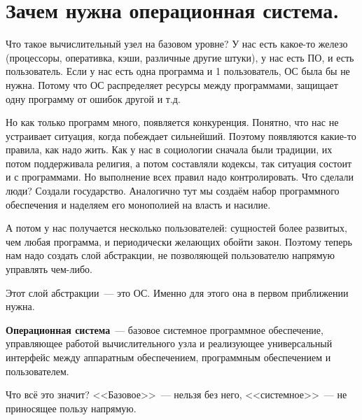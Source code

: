 \documentclass{article}
\begin{document}
    \tableofcontents\pagebreak
    \section{Зачем нужна операционная система.}
    Что такое вычислительный узел на базовом уровне? У нас есть какое-то железо (процессоры, оперативка, кэши, различные другие штуки), у нас есть ПО, и есть пользователь. Если у нас есть одна программа и 1 пользователь, ОС была бы не нужна. Потому что ОС распределяет ресурсы между программами, защищает одну программу от ошибок другой и т.д.
    
    Но как только программ много, появляется конкуренция. Понятно, что нас не устраивает ситуация, когда побеждает сильнейший. Поэтому появляются какие-то правила, как надо жить. Как у нас в социологии сначала были традиции, их потом поддерживала религия, а потом составляли кодексы, так ситуация состоит и с программами. Но выполнение всех правил надо контролировать. Что сделали люди? Создали государство. Аналогично тут мы создаём набор программного обеспечения и наделяем его монополией на власть и насилие.
    
    А потом у нас получается несколько пользователей: сущностей более развитых, чем любая программа, и периодически желающих обойти закон. Поэтому теперь нам надо создать слой абстракции, не позволяющей пользователю напрямую управлять чем-либо.
    
    Этот слой абстракции~--- это ОС. Именно для этого она в первом приближении нужна.
    \begin{definition}
        \textbf{Операционная система}~--- базовое системное программное обеспечение, управляющее работой вычислительного узла и реализующее универсальный интерфейс между аппаратным обеспечением, программным обеспечением и пользователем.
    \end{definition}
    Что всё это значит? <<Базовое>>~--- нельзя без него, <<системное>>~--- не приносящее пользу напрямую.
    \begin{figure}[H]
    \end{figure}
\end{document}

